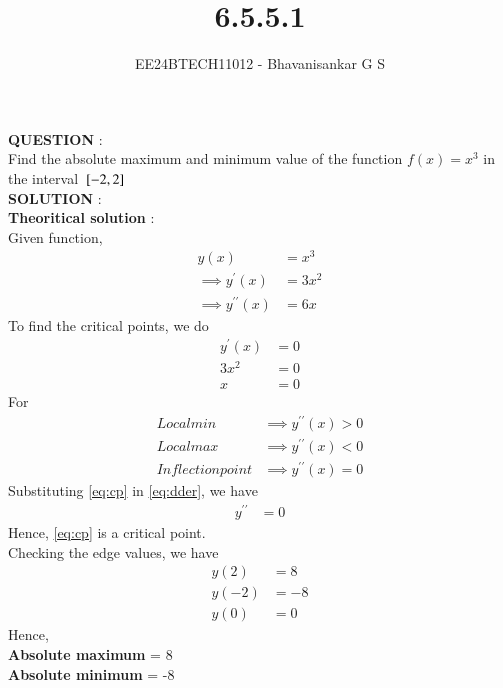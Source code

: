 \documentclass[journal]{IEEEtran}
\begin{document}

\vspace{3cm}

\title{6.5.5.1}
\author{EE24BTECH11012 - Bhavanisankar G S}
{\let\newpage\relax\maketitle}

\renewcommand{\thefigure}{\theenumi}
\renewcommand{\thetable}{\theenumi}
\setlength{\intextsep}{10pt} %


\renewcommand{\thetable}{\theenumi}

\textbf{QUESTION} : \\
Find the absolute maximum and minimum value of the function $f(x) = x^3$ in the interval ${}\left[-2,2\right]$ \\
\textbf{SOLUTION} : \\

\textbf{Theoritical solution} : \\
Given function, 
\begin{align}
	y(x) &= x^3 \label{eq:fn} \\
	\implies y^{\prime} (x) &= 3 x^2  \label{eq:der} \\
	\implies y^{\prime \prime} (x) &= 6 x \label{eq:dder}
\end{align}
To find the critical points, we do
\begin{align}
	y^{\prime} (x) &= 0 \\
	3 x^2 &= 0 \\
	x &= 0 \label{eq:cp}
\end{align}
For 
\begin{align}
	Local min &\implies y^{\prime \prime} (x) > 0 \\
	Local max &\implies y^{\prime \prime} (x) < 0 \\
	Inflection point &\implies y^{\prime \prime} (x) = 0
\end{align}
Substituting \eqref{eq:cp} in \eqref{eq:dder}, we have
\begin{align}
	y^{\prime \prime} &= 0
\end{align}
Hence, \eqref{eq:cp} is a critical point. \\
Checking the edge values, we have \\
\begin{align}
	y(2) &= 8 \\
	y(-2) &= -8 \\
	y(0) &= 0
\end{align}
Hence, \\
\textbf{Absolute maximum} = 8 \\
\textbf{Absolute minimum} = -8 \\
\end{document}
